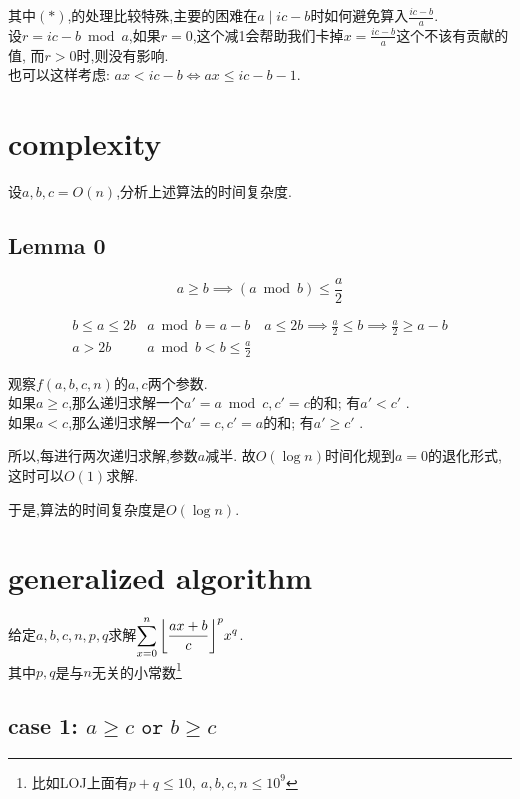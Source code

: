 \documentclass{article}
\begin{document}
其中$(\ast)$,的处理比较特殊,主要的困难在$a\mid ic-b$时如何避免算入$\frac{ic-b}{a}$.\\
设$r=ic-b\bmod a$,如果$r=0$,这个减1会帮助我们卡掉$x=\frac{ic-b}{a}$这个不该有贡献的值, 而$r>0$时,则没有影响.\\
也可以这样考虑: $ax < ic-b\iff ax \leq ic-b-1$.


\section{complexity}

设$a,b,c=O(n)$,分析上述算法的时间复杂度.

\subsection*{Lemma 0}

\[ a\geq b \implies (a\bmod b) \leq \frac{a}{2} \]

\[
\begin{array}{c|l}
	b\leq a\leq 2b & a\bmod b=a-b\quad a\leq 2b\implies \frac{a}{2}\leq b\implies \frac{a}{2}\geq a-b\\
	a > 2b & a\bmod b < b \leq \frac{a}{2}
\end{array}
\]


观察$f(a,b,c,n)$的$a,c$两个参数.\\
如果$a\geq c$,那么递归求解一个$a'=a\bmod c,c'=c$的和; 有$a' < c'$ .\\
如果$a<    c$,那么递归求解一个$a'=c,c'=a$的和; 有$a' \geq c'$ .\par
所以,每进行两次递归求解,参数$a$减半. 故$O(\log n)$时间化规到$a=0$的退化形式,这时可以$O(1)$求解.\par
于是,算法的时间复杂度是$O(\log n)$.

\section{generalized algorithm}

\noindent 给定$a,b,c,n,p,q$求解$\displaystyle \sum_{x=0}^n
{{ \left\lfloor \frac{ax+b}{c} \right\rfloor }}^{p}
x^q$.\\
其中$p,q$是与$n$无关的小常数\footnote{比如LOJ上面有$p+q\leq 10,\ a,b,c,n\leq 10^9$}


\subsection*{case 1: $a\geq c\texttt{ or }b\geq c$}
\end{document}
